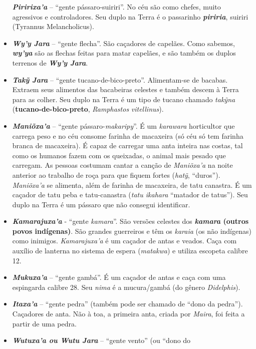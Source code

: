 \begin{itemize}
  \emph{\textbf{Piririxa'a}} -- ``gente pássaro-suiriri''. No céu são
  como chefes, muito agressivos e controladores. Seu duplo na Terra é o
  passarinho \emph{\textbf{piriria}}, suiriri (Tyrannus Melancholicus).
\item
  \emph{\textbf{Wy'y Jara}} -- ``gente flecha''. São caçadores de
  capelães. Como sabemos, \emph{\textbf{wy'ya}} são as flechas feitas
  para matar capelães, e são também os duplos terrenos de
  \emph{\textbf{Wy'y Jara}}.
\item
  \emph{\textbf{Takỹ Jara}} -- ``gente tucano-de-bico-preto''.
  Alimentam-se de bacabas. Extraem seus alimentos das bacabeiras
  celestes e também descem à Terra para as colher. Seu duplo na Terra é
  um tipo de tucano chamado \emph{takỹna}
  (\textbf{tucano-de-bico-preto}, \emph{Ramphastos} \emph{vitellinus}).
\item
  \textbf{\emph{Maniõxa'a}} -- ``gente pássaro-\emph{makaripy}''. É um
  \emph{karawara} horticultor que carrega peso e no céu consome farinha
  de macaxeira (só céu só tem farinha branca de macaxeira). É capaz de
  carregar uma anta inteira nas costas, tal como os humanos fazem com os
  queixadas, o animal mais pesado que carregam. As pessoas costumam
  cantar a canção de \emph{Maniõxa'a} na noite anterior ao trabalho de
  roça para que fiquem fortes (\emph{hatỹ}, ``duros''). \emph{Maniõxa'a}
  se alimenta, além de farinha de macaxeira, de tatu canastra. É um
  caçador de tatu peba e tatu-canastra (\emph{tatu ikahara} ``matador de
  tatus''). Seu duplo na Terra é um pássaro que não consegui
  identificar.
\item
  \textbf{\emph{Kamarajuxa'a}} - ``gente \emph{kamara}''. São versões
  celestes dos \textbf{\emph{kamara} (outros povos indígenas)}. São
  grandes guerreiros e têm os \emph{karaia} (os não indígenas) como
  inimigos. \emph{Kamarajuxa'a} é um caçador de antas e veados. Caça com
  auxílio de lanterna no sistema de espera (\emph{matakwa}) e utiliza
  escopeta calibre 12.
\item
  \emph{\textbf{Mukuxa'a}} -- ``gente gambá''. É um caçador de antas e
  caça com uma espingarda calibre 28. Seu \emph{nima} é a mucura/gambá
  (do gênero \emph{Didelphis}).
\item
  \emph{\textbf{Itaxa'a}} -- ``gente pedra'' (também pode ser chamado de
  ``dono da pedra''). Caçadores de anta. Não à toa, a primeira anta,
  criada por \emph{Maira}, foi feita a partir de uma pedra.
\item
  \emph{\textbf{Wutuxa'a ou Wutu Jara}} -- ``gente vento'' (ou ``dono do

\end{itemize}
